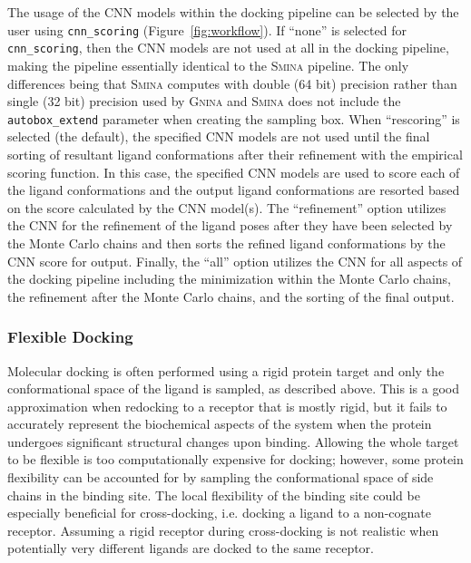 \documentclass[journal=jcisd8,manuscript=article]{achemso}
\begin{document}
The usage of the CNN models within the docking pipeline can be selected by the user using \texttt{cnn\_scoring} (Figure~\ref{fig:workflow}). If ``none'' is selected for \texttt{cnn\_scoring}, then the CNN models are not used at all in the docking pipeline, making the pipeline essentially identical to the \textsc{Smina} pipeline. The only differences being that \textsc{Smina} computes with double (64 bit) precision rather than single (32 bit) precision used by \textsc{Gnina} and \textsc{Smina} does not include the \texttt{autobox\_extend} parameter when creating the sampling box. When ``rescoring'' is selected (the default), the specified CNN models are not used until the final sorting of resultant ligand conformations after their refinement with the empirical scoring function. In this case, the specified CNN models are used to score each of the ligand conformations and the output ligand conformations are resorted based on the score calculated by the CNN model(s). The ``refinement'' option utilizes the CNN for the refinement of the ligand poses after they have been selected by the Monte Carlo chains and then sorts the refined ligand conformations by the CNN score for output. Finally, the ``all'' option utilizes the CNN for all aspects of the docking pipeline including the minimization within the Monte Carlo chains, the refinement after the Monte Carlo chains, and the sorting of the final output. 

\subsubsection{Flexible Docking}

Molecular docking is often performed using a rigid protein target and only the conformational space of the ligand is sampled, as described above. This is a good approximation when redocking to a receptor that is mostly rigid, but it fails to accurately represent the biochemical aspects of the system when the protein undergoes significant structural changes upon binding\cite{Teague2003}. Allowing the whole target to be flexible is too computationally expensive for docking; however, some protein flexibility can be accounted for by sampling the conformational space of side chains in the binding site\cite{Zhao2008}. The local flexibility of the binding site could be especially beneficial for cross-docking, i.e. docking a ligand to a non-cognate receptor. Assuming a rigid receptor during cross-docking is not realistic when potentially very different ligands are docked to the same receptor.
\end{document}
